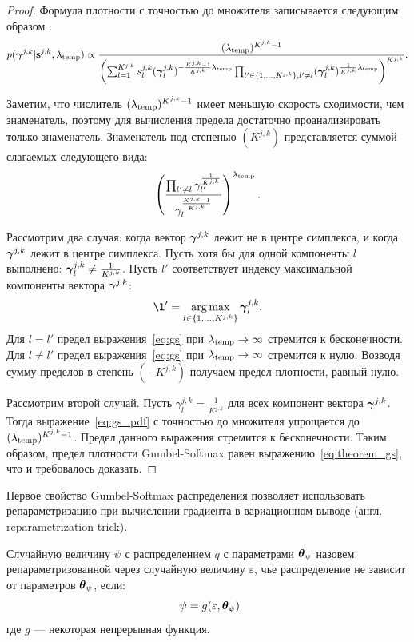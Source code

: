 \begin{proof} 
Формула плотности с точностью до множителя записывается следующим образом :
\begin{equation}
\label{eq:pdf_proof}
    p(\boldsymbol{\gamma}^{j,k}|\mathbf{s}^{j,k}, \lambda_{\text{temp}}) \propto    \frac{(\lambda_{\text{temp}})^{K^{j,k}-1}}{\left(\sum_{l=1}^{K^{j,k}} s^{j,k}_l(\boldsymbol{\gamma}^{j,k}_l)^{-\frac{K^{j,k}-1}{K^{j,k}}\lambda_{\text{temp}}}\prod_{l' \in \{1,\dots,K^{j,k}\}, l' \neq l}(\boldsymbol{\gamma}_l^{j,k})^{\frac{1}{K^{j,k}}\lambda_{\text{temp}}}\right)^{K^{j,k}}}.
\end{equation}

Заметим, что числитель $(\lambda_{\text{temp}})^{K^{j,k}-1}$ имеет меньшую скорость сходимости, чем знаменатель, поэтому для вычисления предела достаточно проанализировать только знаменатель. Знаменатель под степенью $(K^{j,k})$ представляется суммой слагаемых следующего вида: 
\begin{equation}
\label{eq:gs}
    \left(\frac{\prod_{l' \neq l} \gamma_{l'}^{\frac{1}{K^{j,k}}}}{\gamma_l^{\frac{K^{j,k}-1}{K^{j,k}}}}\right)^{\lambda_{\text{temp}}}.
\end{equation}

Рассмотрим два случая: когда вектор $\boldsymbol{\gamma}^{j,k}$  лежит не в центре симплекса, и когда  $\boldsymbol{\gamma}^{j,k}$ лежит в центре симплекса. 
Пусть хотя бы для одной компоненты $l$ выполнено: $\boldsymbol{\gamma}^{j,k}_l \neq \frac{1}{K^{j,k}}$. Пусть $l'$ соответствует индексу максимальной компоненты вектора $\boldsymbol{\gamma}^{j,k}$:
\[
    \l' = \argmax_{l \in \{1,\dots,K^{j,k}\}} \g^{j,k}_l.
\]
Для $l=l'$ предел выражения~\eqref{eq:gs} при $\lambda_{\text{temp}} \to \infty$ стремится к бесконечности. Для $l\neq l'$ предел выражения~\eqref{eq:gs} при $\lambda_{\text{temp}} \to \infty$ стремится к нулю. Возводя сумму пределов в степень $(-K^{j,k})$ получаем предел плотности, равный нулю.

Рассмотрим второй случай. Пусть ${\gamma}^{j,k}_l = \frac{1}{K^{j,k}}$ для всех компонент вектора $\boldsymbol{\gamma}^{j,k}$.
Тогда выражение~\eqref{eq:gs_pdf} с точностью до множителя упрощается до $(\lambda_{\text{temp}})^{K^{j,k}-1}$. Предел данного выражения стремится к бесконечности.
Таким образом, предел плотности Gumbel-Softmax равен выражению~\eqref{eq:theorem_gs}, что и требовалось доказать.

\end{proof}


Первое свойство Gumbel-Softmax распределения позволяет использовать репараметризацию при вычислении градиента в вариационном выводе (англ. reparametrization trick). 
\begin{defin} Случайную величину  $\psi$ с распределением $q$ с параметрами $\boldsymbol{\theta}_\psi$ назовем репараметризованной через случайную величину $\varepsilon$, чье распределение не зависит от параметров $\boldsymbol{\theta}_\psi$, если:
\[
   \psi = g(\varepsilon, \teta_\psi)
\]
где  $g$ --- некоторая непрерывная функция.
\end{defin}

